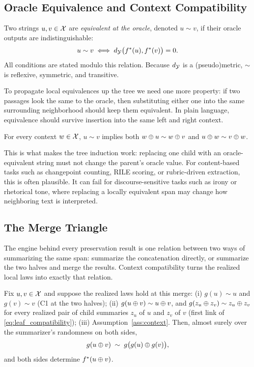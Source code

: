 \subsection{Oracle Equivalence and Context Compatibility}

Two strings $u, v \in \mathcal{X}$ are \emph{equivalent at the oracle}, denoted $u \sim v$, if their oracle outputs are indistinguishable:
\[
u \sim v \;\Longleftrightarrow\; d_{\mathcal{Y}}\big(f^\ast(u), f^\ast(v)\big) = 0.
\]
All conditions are stated modulo this relation. Because $d_{\mathcal{Y}}$ is a (pseudo)metric, $\sim$ is reflexive, symmetric, and transitive.

To propagate local equivalences up the tree we need one more property: if two passages look the same to the oracle, then substituting either one into the same surrounding neighborhood should keep them equivalent. In plain language, equivalence should survive insertion into the same left and right context.

\begin{assumption}\label{ass:context}
For every context $w \in \mathcal{X}$, $u \sim v$ implies both $w \oplus u \sim w \oplus v$ and $u \oplus w \sim v \oplus w$.
\end{assumption}

This is what makes the tree induction work: replacing one child with an oracle-equivalent string must not change the parent's oracle value. For content-based tasks such as changepoint counting, RILE scoring, or rubric-driven extraction, this is often plausible. It can fail for discourse-sensitive tasks such as irony or rhetorical tone, where replacing a locally equivalent span may change how neighboring text is interpreted.

\subsection{The Merge Triangle}

The engine behind every preservation result is one relation between two ways of summarizing the same span: summarize the concatenation directly, or summarize the two halves and merge the results. Context compatibility turns the realized local laws into exactly that relation.

\begin{lemma}\label{lem:merge-triangle}
Fix $u, v \in \mathcal{X}$ and suppose the realized laws hold at this merge:
(i) $g(u) \sim u$ and $g(v) \sim v$ (C1 at the two halves);
(ii) $g(u \oplus v) \sim u \oplus v$, and $g(z_u \oplus z_v) \sim z_u \oplus z_v$ for every realized pair of child summaries $z_u$ of $u$ and $z_v$ of $v$ (first link of \ref{eq:leaf_compatibility});
(iii) Assumption~\ref{ass:context}.
Then, almost surely over the summarizer's randomness on both sides,
\[
g(u \oplus v) \;\sim\; g\big(g(u) \oplus g(v)\big),
\]
and both sides determine $f^\ast(u \oplus v)$.
\end{lemma}

